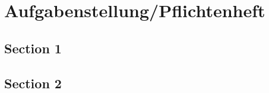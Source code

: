 

\chapter{Aufgabenstellung/Pflichtenheft}


\section{Section 1\authorA}



\section{Section 2\authorB}